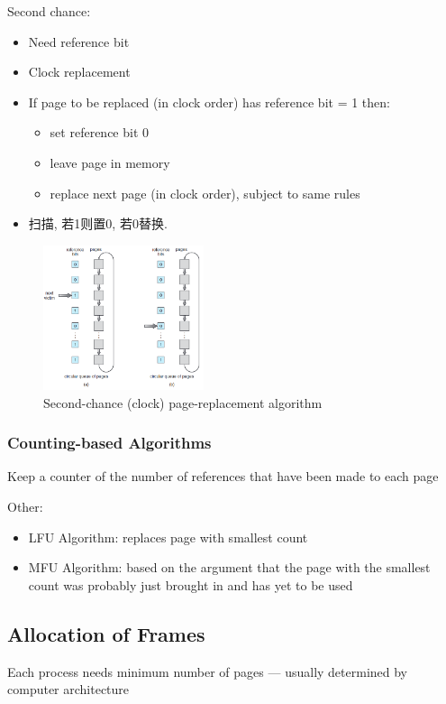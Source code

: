 Second chance: 
\begin{itemize}\scriptsize
    \item Need reference bit
    \item Clock replacement
    \item If page to be replaced (in clock order) has reference bit = 1
    then:
    \begin{itemize}
        \item set reference bit 0
        \item leave page in memory
        \item replace next page (in clock order), subject to same rules
    \end{itemize}
    \item 扫描, 若1则置0, 若0替换. 
\end{itemize}

\begin{figure}[!htb]
    \centering
    \includegraphics[width=0.42\textwidth]{pic/OS9/Second-chance (clock) page-replacement algorithm}
    \caption{Second-chance (clock) page-replacement algorithm}
\end{figure}

\subsubsection{Counting-based Algorithms}
Keep a counter of the number of references that have been made to each page


Other: 
\begin{itemize}\scriptsize
    \item LFU Algorithm: replaces page with smallest count
    \item MFU Algorithm: based on the argument that the page with the smallest count was probably just brought in and has yet to be used
\end{itemize}

\subsection{Allocation of Frames}
Each process needs minimum number of pages --- usually determined by computer architecture

